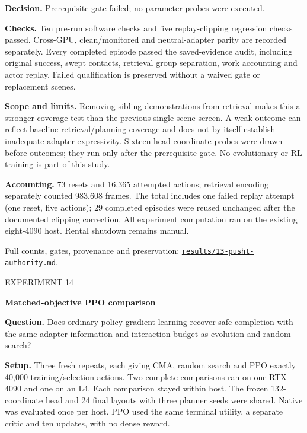 \documentclass[10pt,a4paper]{article}
\begin{document}
\textbf{Decision.} Prerequisite gate failed; no parameter probes were executed.

\textbf{Checks.} Ten pre-run software checks and five replay-clipping regression checks passed. Cross-GPU, clean/monitored and neutral-adapter parity are recorded separately. Every completed episode passed the saved-evidence audit, including original success, swept contacts, retrieval group separation, work accounting and actor replay. Failed qualification is preserved without a waived gate or replacement scenes.

\textbf{Scope and limits.} Removing sibling demonstrations from retrieval makes this a stronger coverage test than the previous single-scene screen. A weak outcome can reflect baseline retrieval/planning coverage and does not by itself establish inadequate adapter expressivity. Sixteen head-coordinate probes were drawn before outcomes; they run only after the prerequisite gate. No evolutionary or RL training is part of this study.

\textbf{Accounting.} 73 resets and 16,365 attempted actions; retrieval encoding separately counted 983,608 frames. The total includes one failed replay attempt (one reset, five actions); 29 completed episodes were reused unchanged after the documented clipping correction. All experiment computation ran on the existing eight-4090 host. Rental shutdown remains manual.

{\footnotesize Full counts, gates, provenance and preservation: \href{results/13-pusht-authority.md}{\texttt{results/13-pusht-authority.md}}.}


\newpage
{\small\textcolor{ink}{EXPERIMENT 14}}\par
{\LARGE\bfseries Matched-objective PPO comparison}\par
\textbf{Question.} Does ordinary policy-gradient learning recover safe completion with the same adapter information and interaction budget as evolution and random search?

\textbf{Setup.} Three fresh repeats, each giving CMA, random search and PPO exactly 40,000 training/selection actions. Two complete comparisons ran on one RTX 4090 and one on an L4. Each comparison stayed within host. The frozen 132-coordinate head and 24 final layouts with three planner seeds were shared. Native was evaluated once per host. PPO used the same terminal utility, a separate critic and ten updates, with no dense reward.
\end{document}
